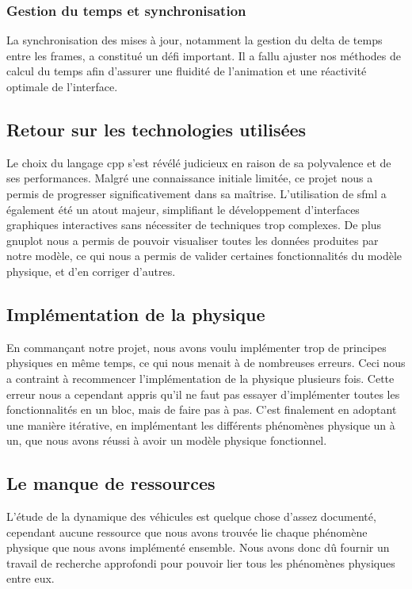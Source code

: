 \subsubsection{Gestion du temps et synchronisation}\label{subsubsec:la-gestion-du-temps}
La synchronisation des mises à jour, notamment la gestion du delta de temps entre les frames, a constitué un défi important.
Il a fallu ajuster nos méthodes de calcul du temps afin d’assurer une fluidité de l’animation et une réactivité optimale de l’interface.

\subsection{Retour sur les technologies utilisées}\label{subsec:retour-sur-les-technologies-utilisees}
Le choix du langage \gls{cpp} s'est révélé judicieux en raison de sa polyvalence et de ses performances.
Malgré une connaissance initiale limitée, ce projet nous a permis de progresser significativement dans sa maîtrise.
L'utilisation de \gls{sfml} a également été un atout majeur, simplifiant le développement d'interfaces graphiques interactives sans nécessiter de techniques trop complexes.
De plus \gls{gnuplot} nous a permis de pouvoir visualiser toutes les données produites par notre modèle, ce qui nous a permis de valider certaines fonctionnalités du modèle physique, et d'en corriger d'autres.

\subsection{Implémentation de la physique}\label{subsec:implem-phys}
En commançant notre projet, nous avons voulu implémenter trop de principes physiques en même temps, ce qui nous menait à de nombreuses erreurs.
Ceci nous a contraint à recommencer l'implémentation de la physique plusieurs fois.
Cette erreur nous a cependant appris qu'il ne faut pas essayer d'implémenter toutes les fonctionnalités en un bloc, mais de faire pas à pas.
C'est finalement en adoptant une manière itérative, en implémentant les différents phénomènes physique un à un, que nous avons réussi à avoir un modèle physique fonctionnel.

\subsection{Le manque de ressources}\label{subsec:manque-ressources}
L'étude de la dynamique des véhicules est quelque chose d'assez documenté, cependant aucune ressource que nous avons trouvée lie chaque phénomène physique que nous avons implémenté ensemble.
Nous avons donc dû fournir un travail de recherche approfondi pour pouvoir lier tous les phénomènes physiques entre eux.

